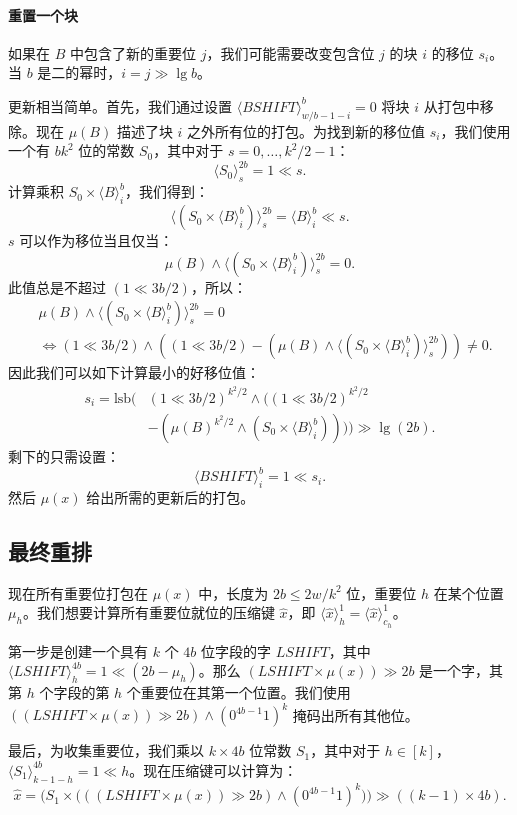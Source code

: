 \documentclass[11pt,a4paper]{ctexart}
\newcommand{\tto}{\text{0}}
\newcommand{\ttl}{\text{1}}
\newcommand{\lpiece}[3]{\langle #1 \rangle_{#2}^{#3}}
\newcommand{\AND}{\land}
\newcommand{\LSHIFT}{\ll}
\newcommand{\RSHIFT}{\gg}
\newcommand{\LSB}{\text{lsb}}
\begin{document}
\paragraph{重置一个块}
如果在 $B$ 中包含了新的重要位 $j$，我们可能需要改变包含位 $j$ 的块 $i$ 的移位 $s_i$。当 $b$ 是二的幂时，$i = j \RSHIFT \lg b$。

更新相当简单。首先，我们通过设置 $\lpiece{BSHIFT}{w/b-1-i}{b} = 0$ 将块 $i$ 从打包中移除。现在 $\mu(B)$ 描述了块 $i$ 之外所有位的打包。为找到新的移位值 $s_i$，我们使用一个有 $b k^2$ 位的常数 $S_0$，其中对于 $s = 0, \dots, k^2/2-1$：
\[
\lpiece{S_0}{s}{2b} = 1 \LSHIFT s.
\]
计算乘积 $S_0 \times \lpiece{B}{i}{b}$，我们得到：
\[
\lpiece{(S_0 \times \lpiece{B}{i}{b})}{s}{2b} = \lpiece{B}{i}{b} \LSHIFT s.
\]
$s$ 可以作为移位当且仅当：
\[
\mu(B) \AND \lpiece{(S_0 \times \lpiece{B}{i}{b})}{s}{2b} = 0.
\]
此值总是不超过 $(1 \LSHIFT 3b/2)$，所以：
\begin{align*}
&\mu(B) \AND \lpiece{(S_0 \times \lpiece{B}{i}{b})}{s}{2b} = 0\\
&\iff (1 \LSHIFT 3b/2) \AND ((1 \LSHIFT 3b/2) - (\mu(B) \AND \lpiece{(S_0 \times \lpiece{B}{i}{b})}{s}{2b})) \neq 0.
\end{align*}
因此我们可以如下计算最小的好移位值：
\begin{align*}
s_i = \LSB\bigl(&(1 \LSHIFT 3b/2)^{k^2/2} \AND ((1 \LSHIFT 3b/2)^{k^2/2} \\
&- (\mu(B)^{k^2/2} \AND (S_0 \times \lpiece{B}{i}{b})))\bigr) \RSHIFT \lg (2b).
\end{align*}
剩下的只需设置：
\[
\lpiece{BSHIFT}{i}{b} = 1 \LSHIFT s_i.
\]
然后 $\mu(x)$ 给出所需的更新后的打包。

\subsection{最终重排}

现在所有重要位打包在 $\mu(x)$ 中，长度为 $2b \leq 2w/k^2$ 位，重要位 $h$ 在某个位置 $\mu_h$。我们想要计算所有重要位就位的压缩键 $\hat{x}$，即 $\lpiece{\hat{x}}{h}{1} = \lpiece{\hat{x}}{c_h}{1}$。

第一步是创建一个具有 $k$ 个 $4b$ 位字段的字 $LSHIFT$，其中 $\lpiece{LSHIFT}{h}{4b} = 1 \LSHIFT (2b - \mu_h)$。那么 $(LSHIFT \times \mu(x)) \RSHIFT 2b$ 是一个字，其第 $h$ 个字段的第 $h$ 个重要位在其第一个位置。我们使用 $((LSHIFT \times \mu(x)) \RSHIFT 2b) \AND (\tto^{4b-1}\ttl)^{k}$ 掩码出所有其他位。

最后，为收集重要位，我们乘以 $k \times 4b$ 位常数 $S_1$，其中对于 $h \in [k]$，$\lpiece{S_1}{k-1-h}{4b} = \ttl \LSHIFT h$。现在压缩键可以计算为：
\[
\hat{x} = \bigl(S_1 \times \bigl(((LSHIFT \times \mu(x)) \RSHIFT 2b) \AND (\tto^{4b-1}\ttl)^{k}\bigr)\bigr) \RSHIFT ((k-1) \times 4b).
\]
\end{document}
